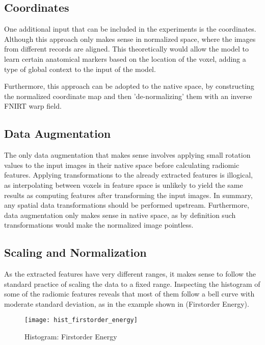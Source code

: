 \subsection{Coordinates}

One additional input that can be included in the experiments is the coordinates. Although this approach only makes sense in normalized space, where the images from different records are aligned. This theoretically would allow the model to learn certain anatomical markers based on the location of the voxel, adding a type of global context to the input of the model.\par
Furthermore, this approach can be adopted to the native space, by constructing the normalized coordinate map and then 'de-normalizing' them with an inverse \ac{FNIRT} warp field.

\subsection{Data Augmentation}

The only data augmentation that makes sense involves applying small rotation values to the input images in their native space before calculating radiomic features. Applying transformations to the already extracted features is illogical, as interpolating between voxels in feature space is unlikely to yield the same results as computing features after transforming the input images. In summary, any spatial data transformations should be performed upstream. Furthermore, data augmentation only makes sense in native space, as by definition such transformations would make the normalized image pointless.

\subsection{Scaling and Normalization}
\label{sec:norm}

As the extracted features have very different ranges, it makes sense to follow the standard practice of scaling the data to a fixed range. Inspecting the histogram of some of the radiomic features reveals that most of them follow a bell curve with moderate standard deviation, as in the example shown in  (Firstorder Energy).\par

\begin{figure}[H]
\centering
\texttt{[image: hist\_firstorder\_energy]}
\caption{Histogram: Firstorder Energy}
\label{fig:hist_fie}
\end{figure}

